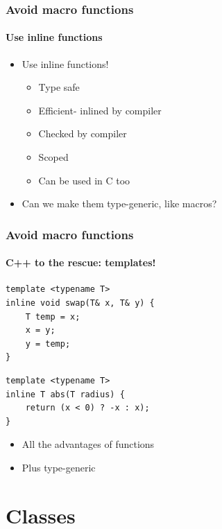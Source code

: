 \documentclass[table]{beamer}
\newcounter{rulecount}
\newcommand{\declarerule}{\textbf{\color{themeblue}{Rule \therulecount:}} }
\begin{document}
\begin{frame}[fragile]
    \frametitle{\declarerule Avoid macro functions}
    \framesubtitle{Use inline functions}
    \begin{itemize}
        \item<1->Use inline functions!
            \begin{itemize}
                \item Type safe
                \item Efficient- inlined by compiler
                \item Checked by compiler
                \item Scoped
                \item Can be used in C too
            \end{itemize}
        \item<2->Can we make them type-generic, like macros?
    \end{itemize}
\end{frame}

\begin{frame}[fragile]
    \frametitle{\declarerule Avoid macro functions}
    \framesubtitle{C++ to the rescue: templates!}
\begin{lstlisting}
template <typename T>
inline void swap(T& x, T& y) {
    T temp = x;
    x = y;
    y = temp;
}
\end{lstlisting}

\begin{lstlisting}
template <typename T>
inline T abs(T radius) {
    return (x < 0) ? -x : x);
}
\end{lstlisting}
\begin{itemize}
    \item All the advantages of functions
    \item Plus type-generic
\end{itemize}
\end{frame}


\section{Classes}
\frame{\sectionpage}
\end{document}
